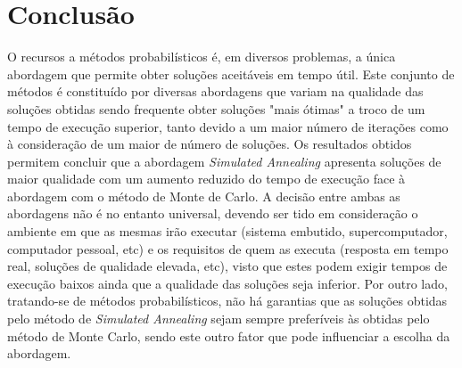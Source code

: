 \documentclass{article}
\begin{document}
\section{Conclusão}
O recursos a métodos probabilísticos é, em diversos problemas, a única abordagem que permite obter soluções aceitáveis em tempo útil. Este conjunto de métodos
é constituído por diversas abordagens que variam na qualidade das soluções obtidas sendo frequente obter soluções "mais ótimas" a troco de um tempo de execução
superior, tanto devido a um maior número de iterações como à consideração de um maior de número de soluções. Os resultados obtidos permitem concluir que a abordagem
\textit{Simulated Annealing}  apresenta soluções de maior qualidade com um aumento reduzido do tempo de execução face à abordagem com o método de Monte de Carlo.
A decisão entre ambas as abordagens não é no entanto universal, devendo ser tido em consideração o ambiente em que as mesmas irão executar (sistema embutido, supercomputador, computador pessoal, etc) e os requisitos de quem
as executa (resposta em tempo real, soluções de qualidade elevada, etc), visto que estes podem exigir tempos de execução baixos ainda que a qualidade das soluções seja inferior. Por outro lado, tratando-se de métodos 
probabilísticos, não há garantias que as soluções obtidas pelo método de \textit{Simulated Annealing} sejam sempre preferíveis às obtidas pelo método de Monte Carlo, sendo este outro fator que pode influenciar a escolha da abordagem.

\newpage 
\end{document}
